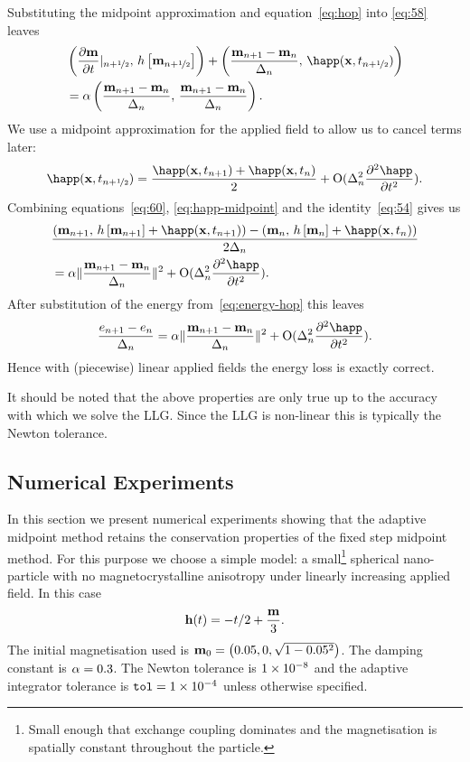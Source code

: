 Substituting the midpoint approximation and equation~\eqref{eq:hop} into \eqref{eq:58} leaves
\begin{align}
  \label{eq:60}
  &\ip{ \pd{\mv}{t} \lvert_{n+\half}}{\hop \left[\mv_{n+\half} \right]} + \ip{\frac{\mv_{n+1} - \mv_n}{\dtn}}{\happ(\xv,t_{n+\half})} \\
  &= \dampc \ip{\frac{\mv_{n+1} - \mv_n}{\dtn}}{\frac{\mv_{n+1} - \mv_n}{\dtn}}.
\end{align}
We use a midpoint approximation for the applied field to allow us to cancel terms later:
\begin{equation}
  \label{eq:happ-midpoint}
  \happ(\xv,t_{n+\half}) = \frac{\happ(\xv, t_{n+1}) + \happ(\xv, t_n)}{2} + \order{\dtn^2 \spd{\happ}{t}}.
\end{equation}
Combining equations~\eqref{eq:60}, \eqref{eq:happ-midpoint} and the identity~\eqref{eq:54} gives us
\begin{align}
  &\frac{\ip{\mv_{n+1}}{\hop \left[\mv_{n+1} \right] + \happ(\xv, t_{n+1})}
    - \ip{\mv_{n}}{\hop \left[\mv_{n} \right] + \happ(\xv, t_n)}
    }{2\dtn} \notag\\
  &= \dampc \norm{\frac{\mv_{n+1} - \mv_n}{\dtn}}^2
  + \order{\dtn^2 \spd{\happ}{t}}.
\end{align}
After substitution of the energy from~\eqref{eq:energy-hop} this leaves
\begin{equation}
  \frac{\e_{n+1} - \e_n}{\dtn}
  = \dampc \norm{\frac{\mv_{n+1} - \mv_n}{\dtn}}^2
  + \order{\dtn^2 \spd{\happ}{t}}.
\end{equation}
Hence with (piecewise) linear applied fields the energy loss is exactly correct.

It should be noted that the above properties are only true up to the accuracy with which we solve the LLG. Since the LLG is non-linear this is typically the Newton tolerance.


\subsection{Numerical Experiments}

In this section we present numerical experiments showing that the adaptive midpoint method retains the conservation properties of the fixed step midpoint method.
For this purpose we choose a simple model: a small\footnote{Small enough that exchange coupling dominates and the magnetisation is spatially constant throughout the particle.} spherical nano-particle with no magnetocrystalline anisotropy under linearly increasing applied field.
In this case
\begin{equation}
  \mathbf{h}(t) = - t/2 +  \frac{\mathbf{m}}{3}.
\end{equation}
The initial magnetisation used is $\mathbf{m}_0 = \left( 0.05, 0, \sqrt{1 - 0.05^2} \right)$.
The damping constant is $\alpha = 0.3$.
The Newton tolerance is $1\times 10^{-8}$ and the adaptive integrator tolerance is ${\textrm{\textup{\texttt{tol}}}} = 1\times 10^{-4}$ unless otherwise specified.

